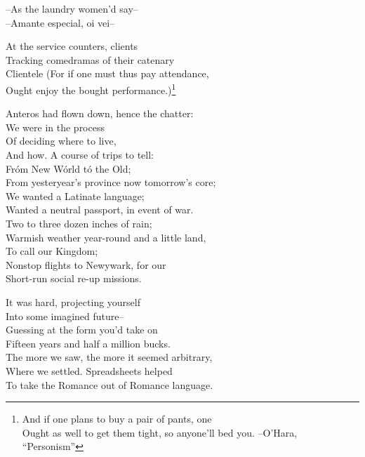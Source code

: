 


--As the laundry women'd say-- \\
--Amante especial, oi vei-- 

At the service counters, clients \\
Tracking comedramas of their catenary \\
Clientele (For if one must thus pay attendance, \\ 
Ought enjoy the bought performance.)\footnote{And if one plans to buy a pair of pants, one \\
Ought as well to get them tight, so anyone'll bed you. --O'Hara, ``Personism''}

Anteros had flown down, hence the chatter: \\
We were in the process \\
Of deciding where to live, \\
And how. A course of trips to tell: \\
Fróm New Wórld tó the Old; \\
From yesteryear's province now tomorrow's core; \\
We wanted a Latinate language; \\
Wanted a neutral passport, in event of war. \\
Two to three dozen inches of rain; \\
Warmish weather year-round and a little land, \\
To call our Kingdom; \\
Nonstop flights to Newywark, for our \\
Short-run social re-up missions.

It was hard, projecting yourself \\
Into some imagined future-- \\
Guessing at the form you'd take on \\
Fifteen years and half a million bucks. \\
The more we saw, the more it seemed arbitrary, \\
Where we settled. Spreadsheets helped \\ 
To take the Romance out of Romance language.

